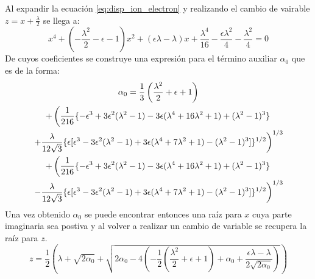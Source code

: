 \documentclass[12pt]{article}
\begin{document}
Al expandir la ecuación \ref{eq:disp_ion_electron} y realizando el cambio de vairable $z=x+\frac{\lambda}{2}$ se llega a:
\begin{equation}
x^4 + (-\frac{\lambda^2}{2} -\epsilon -1)x^2 + (\epsilon \lambda - \lambda)x + \frac{\lambda^4}{16}-\frac{\epsilon \lambda^2}{4}-\frac{\lambda^2}{4}=0
\end{equation}
De cuyos coeficientes se construye una expresión para el término auxiliar $\alpha_0$ que es de la forma:
\begin{multline}
\alpha_0 = \frac{1}{3}\left(\frac{\lambda^2}{2} + \epsilon + 1 \right)\\
+ \left(\frac{1}{216}\lbrace-\epsilon^3+3\epsilon^2(\lambda^2-1)-
3\epsilon(\lambda^4 +16\lambda^2 +1)+ (\lambda^2 -1)^3\rbrace \right. \\
\left. +\frac{\lambda}{12\sqrt{3}}\lbrace\epsilon [\epsilon^3-3\epsilon^2(\lambda^2 -1)+3\epsilon(\lambda^4 + 7\lambda^2 +1)- (\lambda^2-1)^3]\rbrace^{1/2} \vphantom{\frac{1}{216}}\right)^{1/3}\\
+ \left(\frac{1}{216}\lbrace-\epsilon^3+3\epsilon^2(\lambda^2-1)-
3\epsilon(\lambda^4 +16\lambda^2 +1)+ (\lambda^2 -1)^3\rbrace \right. \\
\left. -\frac{\lambda}{12\sqrt{3}}\lbrace\epsilon [\epsilon^3-3\epsilon^2(\lambda^2 -1)+3\epsilon(\lambda^4 + 7\lambda^2 +1)- (\lambda^2-1)^3]\rbrace^{1/2} \vphantom{\frac{1}{216}}\right)^{1/3}
\end{multline}
Una vez obtenido $\alpha_0$ se puede encontrar entonces una raíz para $x$ cuya parte imaginaria sea postiva y al volver a realizar un cambio de variable se recupera la raíz para $z$.
\begin{equation}
z= \frac{1}{2} \left( \lambda + \sqrt{2\alpha_0} + \sqrt{2\alpha_0 -4 \left(-\frac{1}{2}(\frac{\lambda^2}{2}+\epsilon+1)+\alpha_0 +\frac{\epsilon \lambda - \lambda}{2\sqrt{2\alpha_0}}\right)}\right)
\end{equation}
\end{document}
